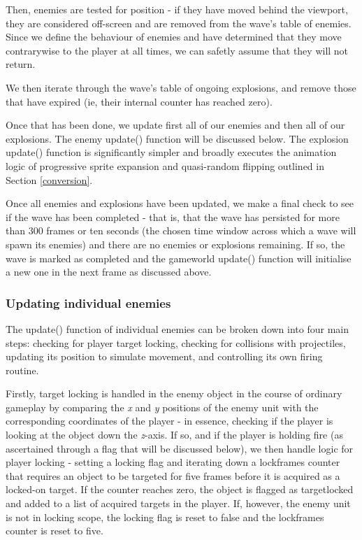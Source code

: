 \documentclass[11pt]{article}
\begin{document}
Then, enemies are tested for position - if they have moved behind the viewport,
they are considered off-screen and are removed from the wave's table of enemies.
Since we define the behaviour of enemies and have determined that they move
contrarywise to the player at all times, we can safetly assume that they will
not return.

We then iterate through the wave's table of ongoing explosions, and remove those
that have expired (ie, their internal counter has reached zero).

Once that has been done, we update first all of our enemies and then all of
our explosions. The enemy update() function will be discussed below. The
explosion update() function is significantly simpler and broadly executes
the animation logic of progressive sprite expansion and quasi-random flipping
outlined in Section \ref{conversion}.

Once all enemies and explosions have been updated, we make a final check to
see if the wave has been completed - that is, that the wave has persisted for
more than 300 frames or ten seconds (the chosen time window across which a
wave will spawn its enemies) and there are no enemies or explosions remaining.
If so, the wave is marked as completed and the game\textunderscore world update()
function will initialise a new one in the next frame as discussed above.

\subsubsection*{Updating individual enemies}

The update() function of individual enemies can be broken down into four main steps: checking for
player target locking, checking for collisions with projectiles, updating its position to simulate
movement, and controlling its own firing routine.

Firstly, target locking is handled in the enemy object in the course of ordinary gameplay by comparing
the \textit{x} and \textit{y} positions of the enemy unit with the corresponding coordinates of the
player - in essence, checking if the player is looking at the object down the \textit{z}-axis. If so,
and if the player is holding fire (as ascertained through a flag that will be discussed below), we then
handle logic for player locking - setting a locking flag and iterating down a lock\textunderscore frames
counter that requires an object to be targeted for five frames before it is acquired as a locked-on
target. If the counter reaches zero, the object is flagged as target\textunderscore locked and added to
a list of acquired targets in the player. If, however, the enemy unit is not in locking scope, the locking
flag is reset to false and the lock\textunderscore frames counter is reset to five.
\end{document}

